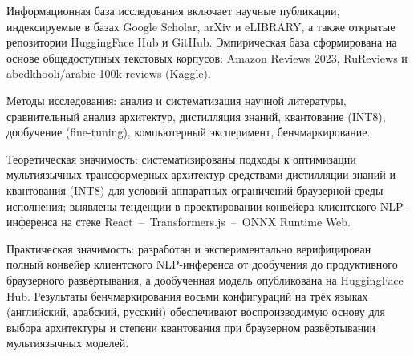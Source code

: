 Информационная база исследования включает научные публикации, индексируемые в базах Google Scholar, arXiv и eLIBRARY, а также открытые репозитории HuggingFace Hub и GitHub. Эмпирическая база сформирована на основе общедоступных текстовых корпусов: Amazon Reviews 2023, RuReviews и abedkhooli/arabic-100k-reviews (Kaggle).

Методы исследования: анализ и систематизация научной литературы, сравнительный анализ архитектур, дистилляция знаний, квантование (INT8), дообучение (fine-tuning), компьютерный эксперимент, бенчмаркирование.

Теоретическая значимость: систематизированы подходы к оптимизации мультиязычных трансформерных архитектур средствами дистилляции знаний и квантования (INT8) для условий аппаратных ограничений браузерной среды исполнения; выявлены тенденции в проектировании конвейера клиентского NLP-инференса на стеке React~–~Transformers.js~–~ONNX Runtime Web.

Практическая значимость: разработан и экспериментально верифицирован полный конвейер клиентского NLP-инференса от дообучения до продуктивного браузерного развёртывания, а дообученная модель опубликована на HuggingFace Hub. Результаты бенчмаркирования восьми конфигураций на трёх языках (английский, арабский, русский) обеспечивают воспроизводимую основу для выбора архитектуры и степени квантования при браузерном развёртывании мультиязычных моделей.